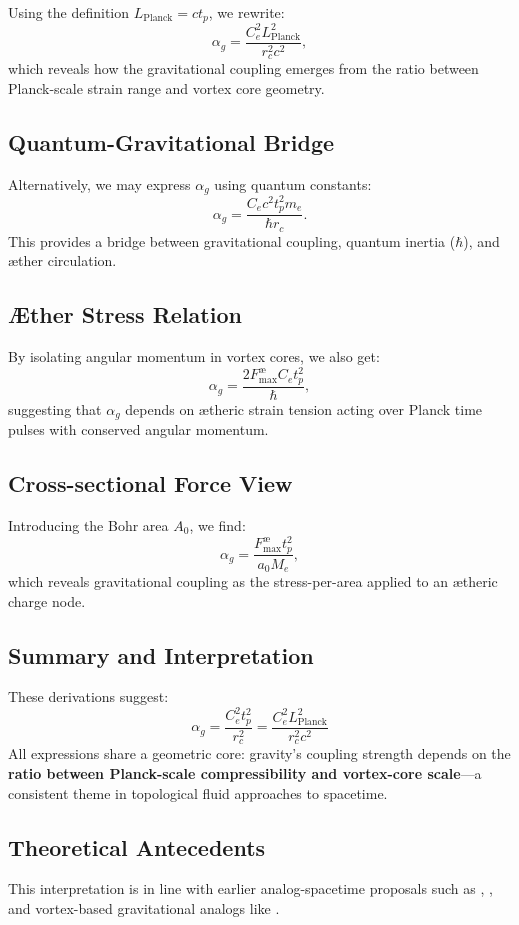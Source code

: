 Using the definition $L_{\text{Planck}} = c t_p$, we rewrite:
\[
    \alpha_g = \frac{C_e^2 L_{\text{Planck}}^2}{r_c^2 c^2},
\]
which reveals how the gravitational coupling emerges from the ratio between Planck-scale strain range and vortex core geometry.

\subsection*{Quantum-Gravitational Bridge}

Alternatively, we may express $\alpha_g$ using quantum constants:
\[
    \alpha_g = \frac{C_e c^2 t_p^2 m_e}{\hbar r_c}.
\]
This provides a bridge between gravitational coupling, quantum inertia ($\hbar$), and æther circulation.

\subsection*{Æther Stress Relation}

By isolating angular momentum in vortex cores, we also get:
\[
    \alpha_g = \frac{2 F^{\text{\ae}}_{\text{max}} C_e t_p^2}{\hbar},
\]
suggesting that $\alpha_g$ depends on ætheric strain tension acting over Planck time pulses with conserved angular momentum.

\subsection*{Cross-sectional Force View}

Introducing the Bohr area $A_0$, we find:
\[
    \alpha_g = \frac{F^{\text{\ae}}_{\text{max}} t_p^2}{a_0 M_e},
\]
which reveals gravitational coupling as the stress-per-area applied to an ætheric charge node.

\subsection*{Summary and Interpretation}

These derivations suggest:
\[
    \boxed{
        \alpha_g = \frac{C_e^2 t_p^2}{r_c^2} = \frac{C_e^2 L_{\text{Planck}}^2}{r_c^2 c^2}
    }
\]
All expressions share a geometric core: gravity’s coupling strength depends on the \textbf{ratio between Planck-scale compressibility and vortex-core scale}—a consistent theme in topological fluid approaches to spacetime.

\subsection*{Theoretical Antecedents}

This interpretation is in line with earlier analog-spacetime proposals such as \cite{barcelo2011}, \cite{volovik2003universe}, and vortex-based gravitational analogs like \cite{ranada1989topological}.
